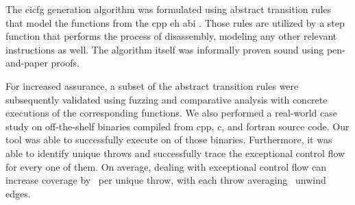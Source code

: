 The \gls{eicfg} generation algorithm was formulated using abstract transition rules that model the functions from the \gls{cpp} \gls{eh} \gls{abi} \autocite{cxxEhAbi}.
Those rules are utilized by a step function that performs the process of disassembly, modeling any other relevant instructions as well.
The algorithm itself was informally proven sound using pen-and-paper proofs.

For increased assurance, a subset of the abstract transition rules were subsequently validated using fuzzing and comparative analysis with  concrete executions of the corresponding functions.
We also performed a real-world case study on  off-the-shelf binaries compiled from \gls{cpp}, \gls{c}, and \gls{fortran} source code.
Our tool was able to successfully execute on  of those binaries.
Furthermore, it was able to identify  unique throws and successfully trace the exceptional control flow for every one of them.
On average, dealing with exceptional control flow can increase coverage by \avgdiffinst\ per unique throw, with each throw averaging \avgunwinds\ unwind edges.
